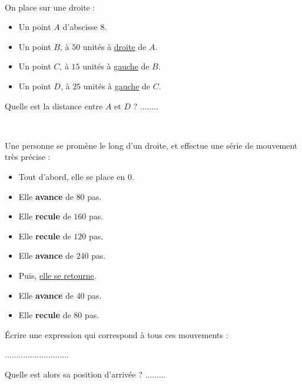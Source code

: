 \documentclass[a4paper,12pt]{article}
\newcommand{\exerciceEspacement}{0.6em}
\begin{document}
\vspace{\exerciceEspacement}

\begin{exercice}\

	On place sur une droite :
	\begin{itemize}
		\item Un point $A$ d'abscisse $8$.
		\item Un point $B$, à $50$ unités à \uline{droite} de $A$.
		\item Un point $C$, à $15$ unités à \uline{gauche} de $B$.
		\item Un point $D$, à $25$ unités à \uline{gauche} de $C$.
	\end{itemize}


	Quelle est la distance entre $A$ et $D$ ? ........
\end{exercice}

\vspace{\exerciceEspacement}

\begin{exercice}\

	Une personne se promène le long d'un droite, et effectue une série de mouvement très précise :

	\begin{itemize}
		\item Tout d'abord, elle se place en $0$.
		\item Elle \textbf{avance} de $80$ pas.
		\item Elle \textbf{recule} de $160$ pas.
		\item Elle \textbf{recule} de $120$ pas.
		\item Elle \textbf{avance} de $240$ pas.
		\item Puis, \uline{elle se retourne}.
		\item Elle \textbf{avance} de $40$ pas.
		\item Elle \textbf{recule} de $80$ pas.
	\end{itemize}

	Écrire une expression qui correspond à tous ces mouvements :
	\vspace{0.4em}
	\begin{center}
		............................
	\end{center}
	\vspace{0.4em}

	Quelle est alors sa position d'arrivée ? .........
\end{exercice}
\end{document}
